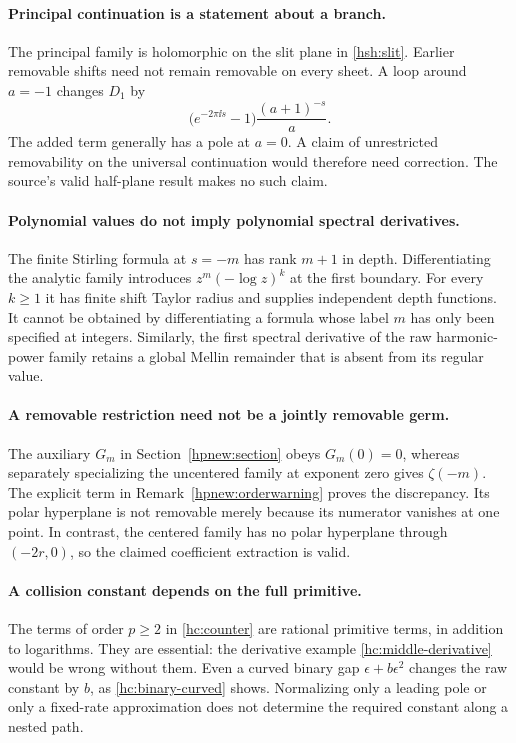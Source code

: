 \paragraph{Principal continuation is a statement about a branch.}
The principal family is holomorphic on the slit plane in
\eqref{hsh:slit}. Earlier removable shifts need not remain removable
on every sheet. A loop around $a=-1$ changes $D_1$ by
\[
 \bigl(e^{-2\pi\ii s}-1\bigr)\frac{(a+1)^{-s}}a.
\]
The added term generally has a pole at $a=0$. A claim of unrestricted
removability on the universal continuation would therefore need
correction. The source's valid half-plane result makes no such claim.

\paragraph{Polynomial values do not imply polynomial spectral derivatives.}
The finite Stirling formula at $s=-m$ has rank $m+1$ in depth.
Differentiating the analytic family introduces
$z^m(-\log z)^k$ at the first boundary. For every $k\ge1$ it has
finite shift Taylor radius and supplies independent depth functions.
It cannot be obtained by differentiating a formula whose label $m$
has only been specified at integers. Similarly, the first spectral
derivative of the raw harmonic-power family retains a global Mellin
remainder that is absent from its regular value.

\paragraph{A removable restriction need not be a jointly removable germ.}
The auxiliary $G_m$ in Section~\ref{hpnew:section} obeys $G_m(0)=0$,
whereas separately specializing the uncentered family at exponent zero
gives $\zeta(-m)$. The explicit term in
Remark~\ref{hpnew:orderwarning} proves the discrepancy. Its polar
hyperplane is not removable merely because its numerator vanishes at
one point. In contrast, the centered family has no polar hyperplane
through $(-2r,0)$, so the claimed coefficient extraction is valid.

\paragraph{A collision constant depends on the full primitive.}
The terms of order $p\ge2$ in \eqref{hc:counter} are rational
primitive terms, in addition to logarithms. They are essential:
the derivative example \eqref{hc:middle-derivative} would be wrong
without them. Even a curved binary gap $\epsilon+b\epsilon^2$
changes the raw constant by $b$, as
\eqref{hc:binary-curved} shows. Normalizing only a leading pole or
only a fixed-rate approximation does not determine the required
constant along a nested path.

